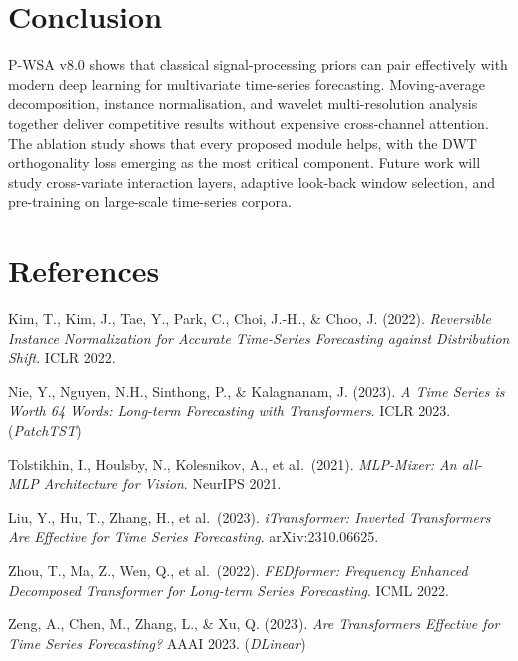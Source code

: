 \documentclass[11pt, letterpaper]{article}
\begin{document}
\section{Conclusion}
\label{sec:conc}

P-WSA v8.0 shows that classical signal-processing priors can pair effectively with modern deep learning for multivariate time-series forecasting. Moving-average decomposition, instance normalisation, and wavelet multi-resolution analysis together deliver competitive results without expensive cross-channel attention. The ablation study shows that every proposed module helps, with the DWT orthogonality loss emerging as the most critical component. Future work will study cross-variate interaction layers, adaptive look-back window selection, and pre-training on large-scale time-series corpora.

\section*{References}

\begin{enumerate}[label={[\arabic*]}]
  \item Kim, T., Kim, J., Tae, Y., Park, C., Choi, J.-H., \& Choo, J. (2022). \textit{Reversible Instance Normalization for Accurate Time-Series Forecasting against Distribution Shift}. ICLR 2022.
  \item Nie, Y., Nguyen, N.H., Sinthong, P., \& Kalagnanam, J. (2023). \textit{A Time Series is Worth 64 Words: Long-term Forecasting with Transformers}. ICLR 2023. (\textit{PatchTST})
  \item Tolstikhin, I., Houlsby, N., Kolesnikov, A., et al.\ (2021). \textit{MLP-Mixer: An all-MLP Architecture for Vision}. NeurIPS 2021.
  \item Liu, Y., Hu, T., Zhang, H., et al.\ (2023). \textit{iTransformer: Inverted Transformers Are Effective for Time Series Forecasting}. arXiv:2310.06625.
  \item Zhou, T., Ma, Z., Wen, Q., et al.\ (2022). \textit{FEDformer: Frequency Enhanced Decomposed Transformer for Long-term Series Forecasting}. ICML 2022.
  \item Zeng, A., Chen, M., Zhang, L., \& Xu, Q. (2023). \textit{Are Transformers Effective for Time Series Forecasting?} AAAI 2023. (\textit{DLinear})
\end{enumerate}
\end{document}
